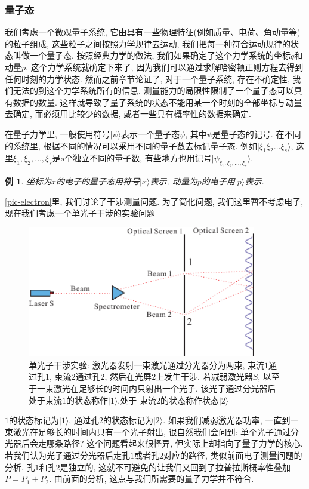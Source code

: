 \documentclass[a4paper,11pt]{article}
\theoremstyle{mystyle}
\newtheorem{example}{\hspace{2em}例}[section]
\begin{document}
\subsubsection{量子态}
我们考虑一个微观量子系统, 它由具有一些物理特征(例如质量、电荷、角动量等)的粒子组成, 这些粒子之间按照力学规律去运动, 我们把每一种符合运动规律的状态叫做一个量子态. 按照经典力学的做法, 我们如果确定了这个力学系统的坐标$q$和动量$p$, 这个力学系统就确定下来了, 因为我们可以通过求解哈密顿正则方程去得到任何时刻的力学状态. 然而之前章节论证了, 对于一个量子系统, 存在不确定性, 我们无法的到这个力学系统所有的信息. 测量能力的局限性限制了一个量子态可以具有数据的数量. 这样就导致了量子系统的状态不能用某一个时刻的全部坐标与动量去确定, 而必须用比较少的数据, 或者一些具有概率性的数据来确定.
\begin{definition}[量子态的符号]
  在量子力学里, 一般使用符号$|\psi\rangle$表示一个量子态$\psi$, 其中$\psi$是量子态的记号. 在不同的系统里, 根据不同的情况可以采用不同的量子数去标记量子态. 例如$|\xi_1\xi_2\dots \xi_s\rangle$, 这里$\xi_1,\xi_2,\dots,\xi_s$是$s$个独立不同的量子数, 有些地方也用记号$|\psi_{\xi_1,\xi_2,\dots,\xi_s}\rangle$.
\end{definition}
\begin{example}
  坐标为$x$的电子的量子态用符号$|x\rangle$表示, 动量为$p$的电子用$|p\rangle$表示.
\end{example}
\ref{pic-electron}里, 我们讨论了干涉测量问题. 为了简化问题, 我们这里暂不考虑电子, 现在我们考虑一个单光子干涉的实验问题
\begin{figure}[H]
  \centering
  \includegraphics[width=10cm]{fig8.pdf}
  \caption{单光子干涉实验: 激光器发射一束激光通过分光器分为两束, 束流$1$通过孔$1$, 束流$2$通过孔$2$, 然后在光屏$2$上发生干涉. 若减弱激光器$S$, 以至于一束激光在足够长的时间内只射出一个光子, 该光子通过分光器后处于束流$1$的状态称作$|1\rangle$,处于 束流$2$的状态称作状态$|2\rangle$}\label{Single photon interference}
\end{figure}
$1$的状态标记为$|1\rangle$, 通过孔$2$的状态标记为$|2\rangle$. 如果我们减弱激光器功率, 一直到一束激光在足够长的时间内只有一个光子射出, 很自然我们会问到: 单个光子通过分光器后会走哪条路径? 这个问题看起来很怪异, 但实际上却指向了量子力学的核心. 若我们认为光子通过分光器后走孔$1$或者孔$2$对应的路径, 类似前面电子测量问题的分析, 孔$1$和孔$2$是独立的, 这就不可避免的让我们又回到了拉普拉斯概率性叠加$P=P_1+P_2$. 由前面的分析, 这点与我们所需要的量子力学并不符合.
\end{document}

